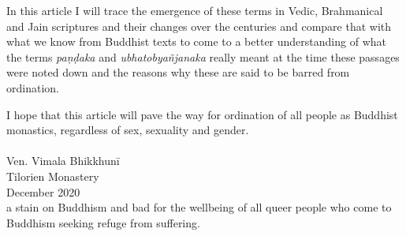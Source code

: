 In this article I will trace the emergence of these terms in Vedic, Brahmanical and Jain scriptures and their changes over the centuries and compare that with what we know from Buddhist texts to come to a better understanding of what the terms {\em paṇḍaka} and {\em ubhatob­yañ­janaka} really meant at the time these passages were noted down and the reasons why these are said to be barred from ordination.

I hope that this article will pave the way for ordination of all people as Buddhist monastics, regardless of sex, sexuality and gender.\\\\
Ven. Vimala Bhikkhunī\\
Tilorien Monastery\\
December 2020\\


a stain on Buddhism and bad for the wellbeing of all queer people who come to Buddhism seeking refuge from suffering.